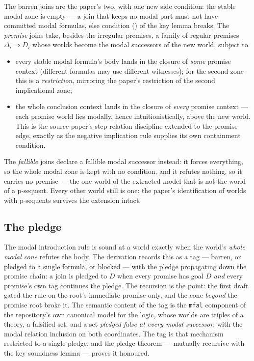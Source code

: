 \documentclass[11pt,a4paper]{article}
\begin{document}
The barren joins are the paper's two, with one new side condition: the
stable modal zone is empty --- a join that keeps no modal part must not
have committed modal formulas, else condition (\dag) of the key lemma
breaks.  The \emph{promise} joins take, besides the irregular premises, a
family of regular premises $\Delta_i \Rightarrow D_i$ whose worlds become
the modal successors of the new world, subject to
\begin{itemize}
\item[(J5)] every stable modal formula's body lands in the closure of
  \emph{some} promise context (different formulas may use different
  witnesses); for the second zone this is a \emph{restriction}, mirroring
  the paper's restriction of the second implicational zone;
\item[(J7)] the whole conclusion context lands in the closure of
  \emph{every} promise context --- each promise world lies modally, hence
  intuitionistically, above the new world.  This is the source paper's
  step-relation discipline extended to the promise edge, exactly as the
  negative implication rule supplies its own containment condition.
\end{itemize}
The \emph{fallible} joins declare a fallible modal successor instead: it
forces everything, so the whole modal zone is kept with no condition, and
it refutes nothing, so it carries no premise --- the one world of the
extracted model that is not the world of a p-sequent.  Every other world
still is one: the paper's identification of worlds with p-sequents
survives the extension intact.

\subsection{The pledge}

The modal introduction rule is sound at a world exactly when the world's
\emph{whole modal cone} refutes the body.  The derivation records this as
a tag --- barren, or pledged to a single formula, or blocked --- with the
pledge propagating down the promise chain: a join is pledged to $D$ when
every promise has goal $D$ \emph{and} every promise's own tag continues
the pledge.  The recursion is the point: the first draft gated the rule
on the root's immediate promise only, and the cone \emph{beyond} the
promise root broke it.  The semantic content of the tag is the
\texttt{mfal} component of the repository's own canonical model for the
logic, whose worlds are triples of a theory, a falsified set, and a set
\emph{pledged false at every modal successor}, with the modal relation
inclusion on both coordinates.  The tag is that mechanism restricted to a
single pledge, and the pledge theorem --- mutually recursive with the key
soundness lemma --- proves it honoured.
\end{document}

